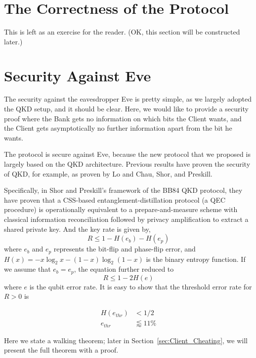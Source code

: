 \documentclass[%
 reprint,
superscriptaddress,
 amsmath,amssymb,
 aps,
]{revtex4-2}
\begin{document}
\section{The Correctness of the Protocol}

This is left as an exercise for the reader. (OK, this section will be constructed later.)

\section{Security Against Eve}
\label{sec:Security_against_Eve}
The security against the eavesdropper Eve is pretty simple, as we largely adopted the QKD setup, and it should be clear. Here, we would like to provide a security proof where the Bank gets no information on which bits the Client wants, and the Client gets asymptotically no further information apart from the bit he wants.

The protocol is secure against Eve, because the new protocol that we proposed is largely based on the QKD architecture. Previous results have proven the security of QKD, for example, as proven by Lo and Chau, Shor, and Preskill.

Specifically, in Shor and Preskill's framework of the BB84 QKD protocol, they have proven that a CSS-based entanglement-distillation protocol (a QEC procedure) is operationally equivalent to a prepare-and-measure scheme with classical information reconciliation followed by privacy amplification to extract a shared private key. And the key rate is given by,
\begin{equation}
    R\le 1-H(e_b)-H(e_p)
\end{equation}
where $e_b$ and $e_p$ represents the bit-flip and phase-flip error, and $H(x)=-x\log_2x-(1-x)\log_2(1-x)$ is the binary entropy function. If we assume that $e_b=e_p$, the equation further reduced to
\begin{equation}
    R \le 1-2H(e)
\end{equation}
where $e$ is the qubit error rate. It is easy to show that the threshold error rate for $R>0$ is

\begin{equation}
\begin{split}
    H(e_{thr})&<1/2\\
    e_{thr}&\lessapprox 11\%
\end{split}
\end{equation}

Here we state a walking theorem; later in Section~\ref{sec:Client_Cheating}, we will present the full theorem with a proof.
\end{document}
